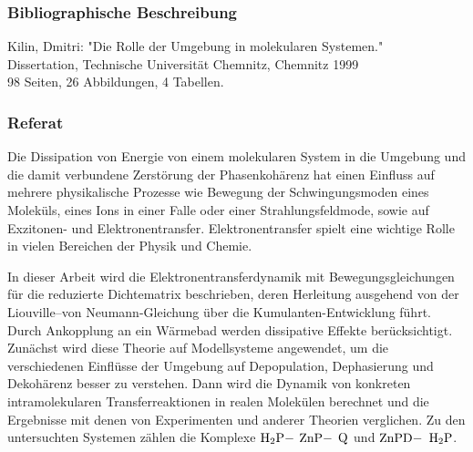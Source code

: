 \documentclass[12pt,twoside,a4paper]{report}
\begin{document}
%

\newpage\thispagestyle{empty}
\subsubsection*{Bibliographische Beschreibung}
Kilin, Dmitri: 
"Die Rolle der Umgebung in
molekularen Systemen."\\
Dissertation, Technische Universit\"at Chemnitz, Chemnitz 1999\\
98 Seiten, 26 Abbildungen, 4 Tabellen.
\bigskip
\subsubsection*{Referat}
Die Dissipation von Energie
von einem molekularen System in die Umgebung und die damit verbundene
Zerst\"orung der Phasenkoh\"arenz
hat einen  Einfluss
auf mehrere physika\-li\-sche Prozesse
wie Bewegung der Schwingungsmoden eines Molek\"uls,
eines  Ions in einer Falle oder einer Strahlungsfeldmode,
sowie auf Exzitonen- und Elektronentransfer.
Elektronentransfer spielt eine wichtige Rolle in vielen Bereichen der
Physik und Chemie. 
%
%

\par
In dieser Arbeit wird die Elektronentransferdynamik mit
Bewegungsgleichungen f\"ur die reduzierte Dichtematrix beschrieben,
deren Herleitung ausgehend von der Liouville--von Neumann-Gleichung
\"uber die 
Kumulanten-Entwicklung
f\"uhrt.
Durch Ankopplung an ein W\"armebad werden dissipative Effekte ber\"ucksichtigt.
Zun\"achst wird diese Theorie auf Modellsysteme angewendet, 
um die verschiedenen 
Einfl\"usse der Umgebung auf 
Depopulation, Dephasierung und Dekoh\"arenz
besser zu verstehen. 
Dann
wird die Dynamik von konkreten intramolekularen Transferreaktionen
in realen Molek\"ulen berechnet und die Ergebnisse mit denen
von Experimenten und anderer Theorien verglichen.
Zu den untersuchten Systemen z\"ahlen  die Komplexe 
${\rm H_2P-}$
${\rm ZnP-}$
${\rm Q}$
und
${\rm ZnPD-}$
${\rm H_2P}$.
\bigskip
\end{document}
